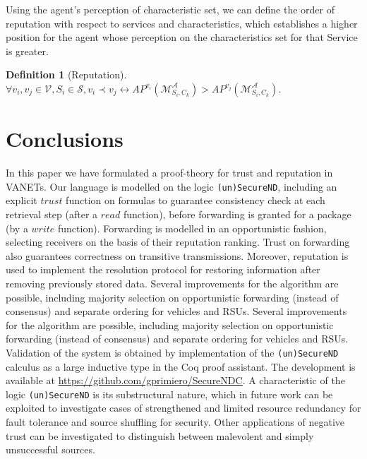 \documentclass[compsoc, conference, letterpaper, 10pt, times]{IEEEtran}
\newtheorem{definition}{Definition}
\begin{document}
Using the agent's perception of characteristic set, we can define the order of reputation with respect to services and characteristics, which establishes a higher position for the agent whose perception on the characteristics set for that Service is greater.

\begin{definition}[Reputation]
$\forall v_{i}, v_{j}\in \mathcal{V}, S_{i}\in \mathcal{S}, v_{i}\prec v_{j} \leftrightarrow AP^{v_{i}}(\mathcal{M}^{\mathcal{A}}_{S_{i}, C_{k}})>AP^{v_{j}}(\mathcal{M}^{\mathcal{A}}_{S_{i}, C_{k}})$.
\end{definition}

\section{Conclusions}

In this paper we have formulated a proof-theory for trust and reputation in VANETs. Our language is modelled on the logic \texttt{(un)SecureND}, including an explicit $trust$ function on formulas to guarantee consistency check at each retrieval step (after a $read$ function), before forwarding is granted for a package (by a $write$ function). Forwarding is modelled in an opportunistic fashion, selecting receivers on the basis of their reputation ranking. Trust on forwarding also guarantees correctness on transitive transmissions. Moreover, reputation is used to implement the resolution protocol for restoring information after removing previously stored data. Several improvements for the algorithm are possible, including majority selection on opportunistic forwarding (instead of consensus) and separate ordering for vehicles and RSUs. Several improvements for the algorithm are possible, including majority selection on opportunistic forwarding (instead of consensus) and separate ordering for vehicles and RSUs.
Validation of the system is obtained by implementation of the \texttt{(un)SecureND} calculus as a large inductive type in the Coq proof assistant. The development is available at \url{https://github.com/gprimiero/SecureNDC}. 
A characteristic of the logic \texttt{(un)SecureND} is its substructural nature, which in future work can be exploited to investigate cases of strengthened and limited resource redundancy for fault tolerance and source shuffling for security. Other applications of negative trust can be investigated to distinguish between malevolent and simply unsuccessful sources.




\end{document}
